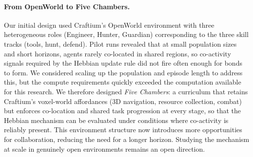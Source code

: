 \paragraph{From OpenWorld to Five Chambers.} Our initial design used Craftium's OpenWorld environment with three heterogeneous roles (Engineer, Hunter, Guardian) corresponding to the three skill tracks (tools, hunt, defend). Pilot runs revealed that at small population sizes and short horizons, agents rarely co-located in shared regions, so co-activity signals required by the Hebbian update rule did not fire often enough for bonds to form. We considered scaling up the population and episode length to address this, but the compute requirements quickly exceeded the computation available for this research. We therefore designed \emph{Five Chambers}: a curriculum that retains Craftium's voxel-world affordances (3D navigation, resource collection, combat) but enforces co-location and shared task progression at every stage, so that the Hebbian mechanism can be evaluated under conditions where co-activity is reliably present. This environment structure now introduces more opportunities for collaboration, reducing the need for a longer horizon. Studying the mechanism at scale in genuinely open environments remains an open direction.





